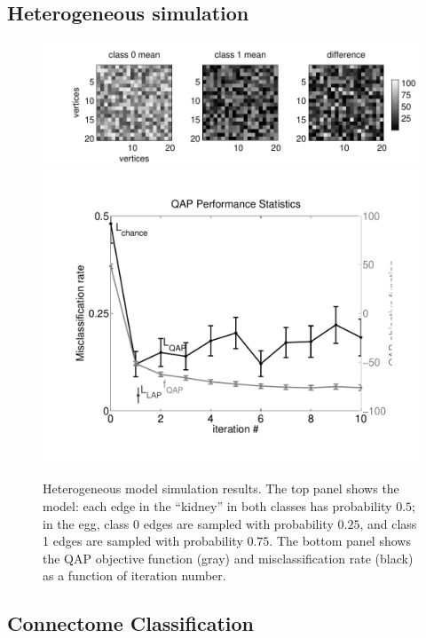 \documentclass{article} %
\begin{document}


\subsection{Heterogeneous simulation} %
\label{sub:heterogeneous_simulation}


\begin{figure}[htbp]
	\centering			
	\includegraphics[width=0.5\linewidth]{../figs/hetero_model}
	\includegraphics[width=0.4\linewidth]{../figs/hetero_performance}
	\caption{Heterogeneous model simulation results. The top panel shows the model: each edge in the ``kidney'' in both classes has probability $0.5$; in the egg, class 0 edges are sampled with probability $0.25$, and class 1 edges are sampled with probability $0.75$. The bottom panel shows the QAP objective function (gray) and misclassification rate (black) as a function of iteration number.  }
	\label{fig:hetero}
\end{figure}





\subsection{Connectome Classification} %
\label{sub:connectome_classification}
\end{document}
